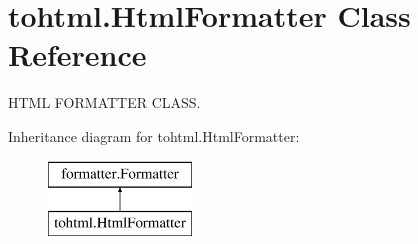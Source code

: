 \hypertarget{classtohtml_1_1_html_formatter}{}\section{tohtml.\+Html\+Formatter Class Reference}
\label{classtohtml_1_1_html_formatter}


H\+T\+ML F\+O\+R\+M\+A\+T\+T\+ER C\+L\+A\+SS.  


Inheritance diagram for tohtml.\+Html\+Formatter\+:\begin{figure}[H]
\begin{center}
\leavevmode
\includegraphics[height=2.000000cm]{classtohtml_1_1_html_formatter}
\end{center}
\end{figure}
